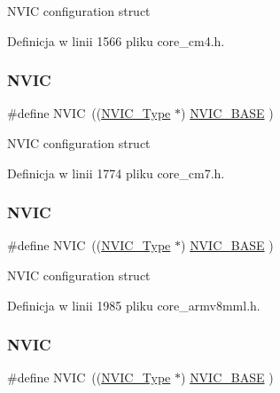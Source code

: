 N\+V\+IC configuration struct 

Definicja w linii 1566 pliku core\+\_\+cm4.\+h.

\mbox{\label{group___c_m_s_i_s__core__base_gac8e97e8ce56ae9f57da1363a937f8a17}} 
\subsubsection{\texorpdfstring{N\+V\+IC}{NVIC}\hspace{0.1cm}{\footnotesize\ttfamily [10/12]}}
{\footnotesize\ttfamily \#define N\+V\+IC~((\hyperlink{struct_n_v_i_c___type}{N\+V\+I\+C\+\_\+\+Type}      $\ast$)     \hyperlink{group___c_m_s_i_s__core__base_gaa0288691785a5f868238e0468b39523d}{N\+V\+I\+C\+\_\+\+B\+A\+SE}     )}

N\+V\+IC configuration struct 

Definicja w linii 1774 pliku core\+\_\+cm7.\+h.

\mbox{\label{group___c_m_s_i_s__core__base_gac8e97e8ce56ae9f57da1363a937f8a17}} 
\subsubsection{\texorpdfstring{N\+V\+IC}{NVIC}\hspace{0.1cm}{\footnotesize\ttfamily [11/12]}}
{\footnotesize\ttfamily \#define N\+V\+IC~((\hyperlink{struct_n_v_i_c___type}{N\+V\+I\+C\+\_\+\+Type}      $\ast$)     \hyperlink{group___c_m_s_i_s__core__base_gaa0288691785a5f868238e0468b39523d}{N\+V\+I\+C\+\_\+\+B\+A\+SE}        )}

N\+V\+IC configuration struct 

Definicja w linii 1985 pliku core\+\_\+armv8mml.\+h.

\mbox{\label{group___c_m_s_i_s__core__base_gac8e97e8ce56ae9f57da1363a937f8a17}} 
\subsubsection{\texorpdfstring{N\+V\+IC}{NVIC}\hspace{0.1cm}{\footnotesize\ttfamily [12/12]}}
{\footnotesize\ttfamily \#define N\+V\+IC~((\hyperlink{struct_n_v_i_c___type}{N\+V\+I\+C\+\_\+\+Type}      $\ast$)     \hyperlink{group___c_m_s_i_s__core__base_gaa0288691785a5f868238e0468b39523d}{N\+V\+I\+C\+\_\+\+B\+A\+SE}        )}

